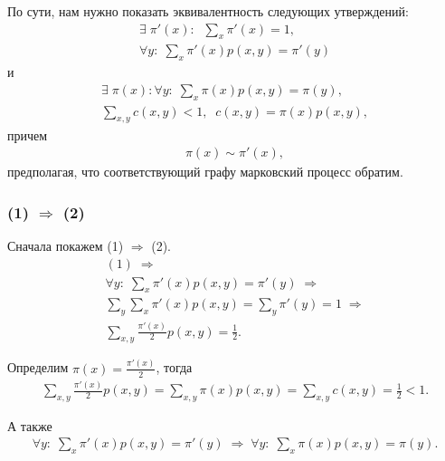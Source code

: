 \documentclass[10pt]{article}
\begin{document}
По сути, нам нужно показать эквивалентность следующих утверждений:
\begin{equation} \begin{aligned}
  \exists \; \pi'(x): \;\; \sum\limits_{x} \pi'(x) = 1, \\
  \forall y: \; \sum\limits_{x} \pi'(x) p(x, y) = \pi'(y)
\end{aligned} \end{equation}
и
\begin{equation} \begin{aligned}
  \exists \; \pi(x): \forall y: \; \sum\limits_{x} \pi(x) p(x, y) = \pi(y),  \\
  \sum\limits_{x, y} c(x, y) < 1, \;\; c(x, y) = \pi(x) p(x, y),
\end{aligned} \end{equation}
причем
\begin{equation} \begin{aligned}
  \pi(x) \sim \pi'(x),
\end{aligned} \end{equation}
предполагая, что соответствующий графу марковский процесс обратим.

\medskip

\subsubsection{(1) $\Rightarrow$ (2)}

Сначала покажем (1) $\Rightarrow$ (2).
\begin{gather*}
  (1) \; \Rightarrow \\
  \forall y: \; \sum\limits_{x} \pi'(x) p(x, y) = \pi'(y) \; \Rightarrow \\
  \sum\limits_{y} \sum\limits_{x} \pi'(x) p(x, y) = \sum\limits_{y} \pi'(y) = 1 \; \Rightarrow \\
  \sum\limits_{x, y} \frac{\pi'(x)}{2} p(x, y) = \frac{1}{2}.
\end{gather*}

Определим $\pi(x) = \frac{\pi'(x)}{2}$, тогда
\begin{gather*}
  \sum\limits_{x, y} \frac{\pi'(x)}{2} p(x, y) = \sum\limits_{x, y} \pi(x) p(x, y) = \sum\limits_{x, y} c(x, y) = \frac{1}{2} < 1.
\end{gather*}

А также
\begin{gather*}
  \forall y: \; \sum\limits_{x} \pi'(x) p(x, y) = \pi'(y) \; \Rightarrow \; \forall y: \; \sum\limits_{x} \pi(x) p(x, y) = \pi(y).
\end{gather*}
\end{document}
